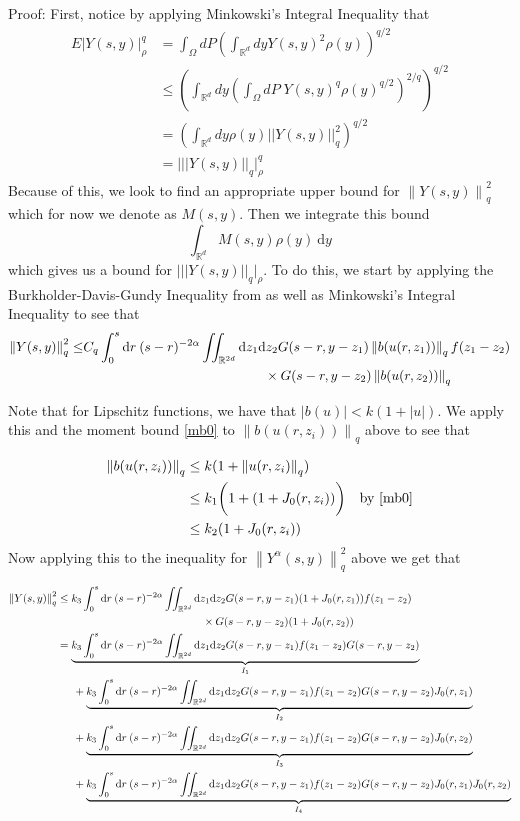 \documentclass{article}
\numberwithin{equation}{section}
\newcommand{\R}{\mathbb{R}}
\newcommand{\Norm}[1]{\left\|  #1   \right\|}
\newcommand{\ud}{\ensuremath{\mathrm{d}}}
\begin{document}
Proof: First, notice by applying Minkowski's Integral Inequality that 
\begin{align*}
E |Y(s,y)|_{\rho}^q &= \int_\Omega dP \left(\int_{\R^d} dy Y(s,y)^2\rho(y) \right)^{q/2} 
\\ &\le \left(\int_{\R^d}dy \left( \int_\Omega dP \; Y(s,y)^q \rho(y)^{q/2} \right)^{2/q}\right)^{q/2} 
\\ &= \left(\int_{\R^d}dy \rho(y) || Y(s,y) ||_q^2 \right)^{q/2}
\\ &= \bigg|||Y(s,y)||_q\bigg|_\rho^q
\end{align*}
Because of this, we look to find an appropriate upper bound for $\Norm{Y(s,y)}^2_q$ which for now we denote as $M(s,y)$. Then we integrate this bound $$ \int_{\R^d}M(s,y)\rho(y)\:\ud y$$ which gives us a bound for $\bigg|||Y(s,y)||_q\bigg|_\rho$. To do this, we start by applying the Burkholder-Davis-Gundy Inequality from \cite{DalangEtc09Minicourse} as well as Minkowski's Integral Inequality to see that
\begin{align*}
\Norm{Y(s,y)}_q^2 \le & C_q \int_0^s \ud r \: (s-r)^{-2\alpha} \iint_{\R^{2d}} \ud z_1\ud z_2 G(s-r,y-z_1)  \Norm{b(u(r,z_1))}_q f(z_1-z_2)\\
&\hspace{13.5em} \times  G(s-r,y-z_2) \Norm{b(u(r,z_2))}_q
\end{align*}

Note that for Lipschitz functions, we have that $|b(u)|<k(1+|u|)$. We apply this and the moment bound \eqref{mb0} to $\Norm{b(u(r,z_i))}_q$ above to see that 

\begin{align*}
\Norm{b(u(r,z_i))}_q  &\le k(1+\Norm{u(r,z_i)}_q)
\\ &\le k_1\bigg(1+(1+J_0(r,z_i))\bigg) \quad \text{by \eqref{mb0}}
\\ &\le k_2(1+J_0(r,z_i))
\end{align*}
Now applying this to the inequality for $\Norm{Y^{\alpha}(s,y)}_q^2$ above we get that 

\begin{align*}
\Norm{Y(s,y)}_q^2 &\le k_3 \int_0^s \ud r \: (s-r)^{-2\alpha} \iint_{\R^{2d}} \ud z_1\ud z_2 G(s-r,y-z_1)  (1+J_0(r,z_1)) f(z_1-z_2)\\
&\hspace{13.5em} \times  G(s-r,y-z_2) (1+J_0(r,z_2))
\\ &= \underbrace{ k_3 \int_0^s \ud r \: (s-r)^{-2\alpha} \iint_{\R^{2d}} \ud z_1\ud z_2 G(s-r,y-z_1)f(z_1-z_2)G(s-r,y-z_2)}_{I_1}
\\ &\hspace{1.5em}+ \underbrace{ k_3 \int_0^s \ud r \: (s-r)^{-2\alpha} \iint_{\R^{2d}} \ud z_1\ud z_2 G(s-r,y-z_1)f(z_1-z_2)G(s-r,y-z_2)J_0(r,z_1)}_{I_2}
\\ &\hspace{1.5em}+ \underbrace{ k_3 \int_0^s \ud r \: (s-r)^{-2\alpha} \iint_{\R^{2d}} \ud z_1\ud z_2 G(s-r,y-z_1)f(z_1-z_2)G(s-r,y-z_2)J_0(r,z_2)}_{I_3} 
\\ &\hspace{1.5em}+ \underbrace{ k_3 \int_0^s \ud r \: (s-r)^{-2\alpha} \iint_{\R^{2d}} \ud z_1\ud z_2 G(s-r,y-z_1)f(z_1-z_2)G(s-r,y-z_2)J_0(r,z_1)J_0(r,z_2)}_{I_4}
\end{align*}
\end{document}

